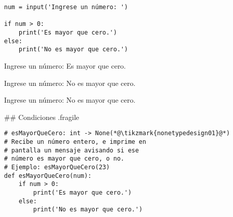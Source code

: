 \vspace{-3ex}

\bgncolumns
{}
\vspace{-1ex}


\begin{lstlisting}
num = input('Ingrese un número: ')

if num > 0:
    print('Es mayor que cero.')
else:
    print('No es mayor que cero.')
\end{lstlisting}


\vspace{-1ex}


\begin{exampleConsole}
Ingrese un número: 
Es mayor que cero.
\end{exampleConsole}

\fullrule


\begin{exampleConsole}
Ingrese un número: 
No es mayor que cero.
\end{exampleConsole}

\fullrule


\begin{exampleConsole}
Ingrese un número: 
No es mayor que cero.
\end{exampleConsole}

\trmcolumns

## Condiciones {.fragile}

\begin{lstlisting}
# esMayorQueCero: int -> None(*@\tikzmark{nonetypedesign01}@*)
# Recibe un número entero, e imprime en
# pantalla un mensaje avisando si ese
# número es mayor que cero, o no.
# Ejemplo: esMayorQueCero(23)
def esMayorQueCero(num):
    if num > 0:
        print('Es mayor que cero.')
    else:
        print('No es mayor que cero.')
\end{lstlisting}

